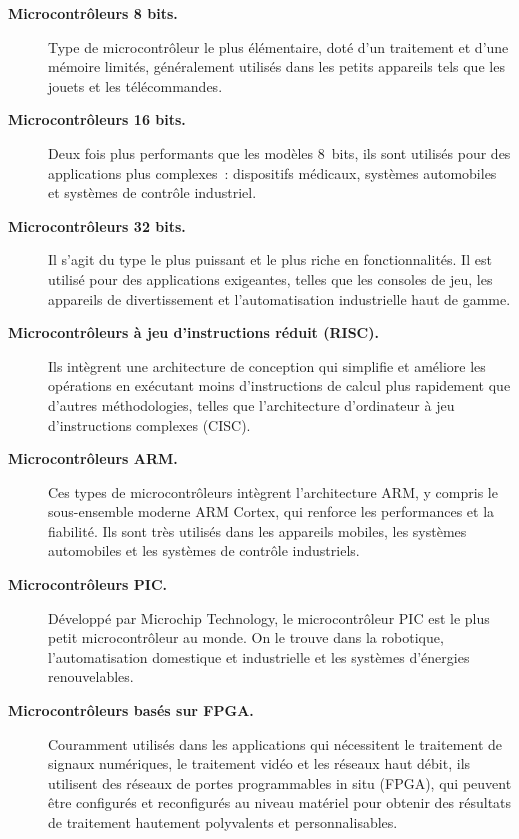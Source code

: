 \documentclass[a4paper,12pt,twoside]{report}
\theoremstyle{definition}
\theoremstyle{plain}
\theoremstyle{remark}
\begin{document}
\begin{description}
	\item[\textbf{Microcontrôleurs 8 bits.}] Type de microcontrôleur le plus élémentaire,
	doté d'un traitement et d'une mémoire limités, généralement utilisés dans les petits
	appareils tels que les jouets et les télécommandes.

	\item[\textbf{Microcontrôleurs 16 bits.}] Deux fois plus performants que les modèles
	8~bits, ils sont utilisés pour des applications plus complexes~: dispositifs médicaux,
	systèmes automobiles et systèmes de contrôle industriel.

	\item[\textbf{Microcontrôleurs 32 bits.}] Il s'agit du type le plus puissant et le
	plus riche en fonctionnalités. Il est utilisé pour des applications exigeantes, telles
	que les consoles de jeu, les appareils de divertissement et l'automatisation industrielle
	haut de gamme.

	\item[\textbf{Microcontrôleurs à jeu d'instructions réduit (\acs{RISC}).}] Ils
	intègrent une architecture de conception qui simplifie et améliore les opérations en
	exécutant moins d'instructions de calcul plus rapidement que d'autres méthodologies,
	telles que l'architecture d'ordinateur à jeu d'instructions complexes (\ac{CISC}).

	\item[\textbf{Microcontrôleurs ARM.}] Ces types de microcontrôleurs intègrent
	l'architecture \ac{ARM}, y compris le sous-ensemble moderne ARM Cortex, qui renforce
	les performances et la fiabilité. Ils sont très utilisés dans les appareils mobiles,
	les systèmes automobiles et les systèmes de contrôle industriels.

	\item[\textbf{Microcontrôleurs PIC.}] Développé par Microchip Technology, le
	microcontrôleur \ac{PIC} est le plus petit microcontrôleur au monde. On le trouve dans
	la robotique, l'automatisation domestique et industrielle et les systèmes d'énergies
	renouvelables.

	\item[\textbf{Microcontrôleurs basés sur \acs{FPGA}.}] Couramment utilisés dans les
	applications qui nécessitent le traitement de signaux numériques, le traitement vidéo
	et les réseaux haut débit, ils utilisent des réseaux de portes programmables in situ
	(\ac{FPGA}), qui peuvent être configurés et reconfigurés au niveau matériel pour obtenir
	des résultats de traitement hautement polyvalents et personnalisables.
\end{description}
\end{document}

